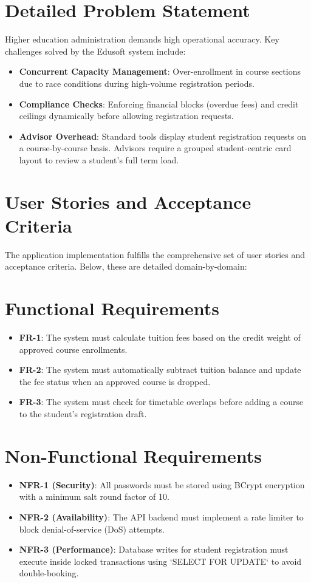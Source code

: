 \documentclass[12pt,a4paper]{report}
\begin{document}
\section{Detailed Problem Statement}
Higher education administration demands high operational accuracy. Key challenges solved by the Edusoft system include:
\begin{itemize}
    \item \textbf{Concurrent Capacity Management}: Over-enrollment in course sections due to race conditions during high-volume registration periods.
    \item \textbf{Compliance Checks}: Enforcing financial blocks (overdue fees) and credit ceilings dynamically before allowing registration requests.
    \item \textbf{Advisor Overhead}: Standard tools display student registration requests on a course-by-course basis. Advisors require a grouped student-centric card layout to review a student's full term load.
\end{itemize}

\section{User Stories and Acceptance Criteria}
The application implementation fulfills the comprehensive set of user stories and acceptance criteria. Below, these are detailed domain-by-domain:



\section{Functional Requirements}
\begin{itemize}
    \item \textbf{FR-1}: The system must calculate tuition fees based on the credit weight of approved course enrollments.
    \item \textbf{FR-2}: The system must automatically subtract tuition balance and update the fee status when an approved course is dropped.
    \item \textbf{FR-3}: The system must check for timetable overlaps before adding a course to the student's registration draft.
\end{itemize}

\section{Non-Functional Requirements}
\begin{itemize}
    \item \textbf{NFR-1 (Security)}: All passwords must be stored using BCrypt encryption with a minimum salt round factor of 10.
    \item \textbf{NFR-2 (Availability)}: The API backend must implement a rate limiter to block denial-of-service (DoS) attempts.
    \item \textbf{NFR-3 (Performance)}: Database writes for student registration must execute inside locked transactions using `SELECT FOR UPDATE` to avoid double-booking.
\end{itemize}
\end{document}
